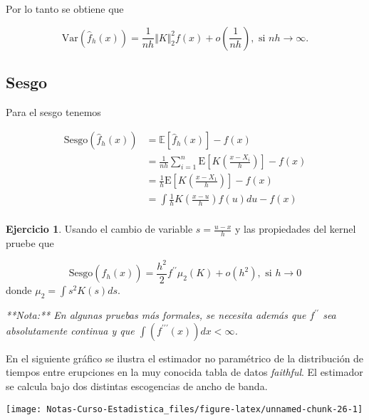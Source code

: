 \documentclass[
  12pt,
]{book}
\theoremstyle{definition}
\theoremstyle{definition}
\theoremstyle{definition}
\newtheorem{exercise}{Ejercicio}[chapter]
\theoremstyle{definition}
\theoremstyle{remark}
\begin{document}
Por lo tanto se obtiene que

\begin{equation*}
\mathrm{Var}\left(\hat{f}_{h}(x)\right) = \frac{1}{nh} \Vert K\Vert_{2}^{2}f(x) + o\left(\frac{1}{nh}\right), \text{ si } nh\to \infty.
\end{equation*}

\hypertarget{sesgo-1}{%
\subsection{Sesgo}\label{sesgo-1}}

Para el sesgo tenemos

\begin{align*}
\mathrm{Sesgo}\left(\hat{f}_{h}(x)\right)
& = \mathbb{E}\left[\hat{f}_{h}(x)\right]-f(x)                                                  \\
& = \frac{1}{nh} \sum_{i=1}^{n} \mathrm{E}\left[K\left( \frac{x-X_{i}}{h} \right)\right] - f(x) \\
& = \frac{1}{h}\mathrm{E}\left[K\left( \frac{x-X_{1}}{h} \right)\right] - f(x)                  \\
& = \int \frac{1}{h} K\left( \frac{x-u}{h}\right)f(u)du -f(x)                                   \\
\end{align*}

\begin{exercise}
\protect\hypertarget{exr:unnamed-chunk-24}{}\label{exr:unnamed-chunk-24}Usando el cambio de variable \(s=\frac{u-x}{h}\) y las propiedades del kernel pruebe que

\begin{equation*}
\mathrm{Sesgo}\left(\hat{f}_{h}(x)\right) = \frac{h^{2}}{2} f^{\prime\prime} \mu_{2}(K) + o(h^{2}), \text{ si } h\to 0
\end{equation*}
donde \(\mu_{2}=\int s^{2}K(s)ds\).

\emph{**Nota:** En algunas pruebas más formales, se necesita
además que  $f^{\prime\prime}$ sea absolutamente continua y que
$\int(f^{\prime\prime\prime}(x))dx<\infty$.}
\end{exercise}

En el siguiente gráfico se ilustra el estimador no paramétrico de la distribución de tiempos entre erupciones en la muy conocida tabla de datos \emph{faithful}. El estimador se calcula bajo dos distintas escogencias de ancho de banda.

\begin{center}\texttt{[image: Notas-Curso-Estadistica\_files/figure-latex/unnamed-chunk-26-1]} \end{center}
\end{document}
